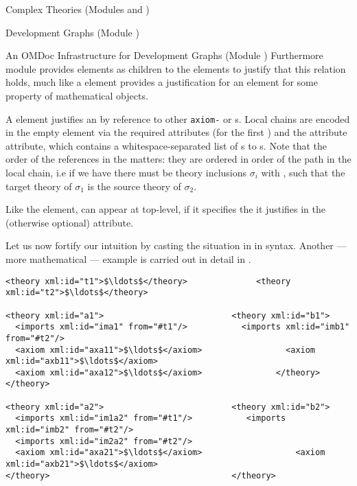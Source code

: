 \begin{tchapter}[id=complex-theories,short=Complex Theories]{Complex Theories (Modules
    {} and {})}
\begin{tsection}[id=development-graphs,short=Development Graphs]{Development Graphs
    (Module {})}
\begin{tsubsection}[id=dg-omdoc,short=OMDoc Development Graphs]{An OMDoc Infrastructure
    for Development Graphs (Module {})}
Furthermore module {} provides {} elements as children
to the {} elements to justify that this relation holds, much like
a {} element provides a justification for an {} element
for some property of mathematical objects.

A {} element justifies an {} by reference to
other {\tt{axiom-}} or {s}. Local chains are
encoded in the empty {} element via the required attributes
{} (for the first {}) and the
attribute {} attribute, which contains a
whitespace-separated list of {s} to
{s}. Note that the order of the references in the
{} matters: they are ordered in order of the path in
the local chain, i.e if we have {} there
must be theory inclusions $\sigma_i$ with {}, such that the
target theory of $\sigma_1$ is the source theory of $\sigma_2$.

Like the {} element, {} can appear at top-level,
if it specifies the {} it justifies in the (otherwise optional)
{} attribute.

Let us now fortify our intuition by casting the situation in {}
in {\omdoc} syntax. Another --- more mathematical --- example is carried out in detail in
{}.

\begin{lstlisting}[label=lst:thi,mathescape,
                   index={theory,imports,axiom},
                   caption={The {\omdoc} representation of the theories
                   in {\myfigref{thi-proof}}.}]
<theory xml:id="t1">$\ldots$</theory>              <theory xml:id="t2">$\ldots$</theory> 

<theory xml:id="a1">                          <theory xml:id="b1">
  <imports xml:id="ima1" from="#t1"/>           <imports xml:id="imb1" from="#t2"/>
  <axiom xml:id="axa11">$\ldots$</axiom>                 <axiom xml:id="axb11">$\ldots$</axiom>
  <axiom xml:id="axa12">$\ldots$</axiom>               </theory>
</theory>

<theory xml:id="a2">                          <theory xml:id="b2">
  <imports xml:id="im1a2" from="#t1"/>           <imports xml:id="imb2" from="#t2"/>
  <imports xml:id="im2a2" from="#t2"/> 
  <axiom xml:id="axa21">$\ldots$</axiom>                   <axiom xml:id="axb21">$\ldots$</axiom>
</theory>                                     </theory>


\end{lstlisting}
\end{tsubsection}
\end{tsection}
\end{tchapter}
